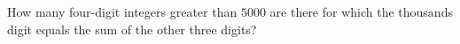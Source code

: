How many four-digit integers greater than $5000$ are there for which the thousands digit equals the sum of the other three digits?
